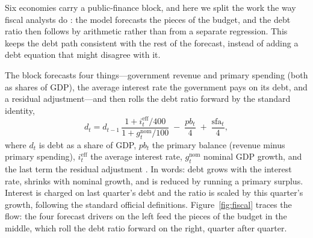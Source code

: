 \documentclass[11pt]{article}
\begin{document}
Six economies carry a public-finance block, and here we split the work the way fiscal analysts do
\citep{Escolano2010,IMF2013DSA}: the model forecasts the pieces of the budget, and the debt ratio then
follows by arithmetic rather than from a separate regression. This keeps the debt path consistent with the
rest of the forecast, instead of adding a debt equation that might disagree with it.

The block forecasts four things---government revenue and primary spending (both as shares of GDP), the
average interest rate the government pays on its debt, and a residual adjustment---and then rolls the debt
ratio forward by the standard identity,
\begin{equation}
  d_t = d_{t-1}\,\frac{1 + i^{\text{eff}}_t/400}{1 + g^{\text{nom}}_t/100}
        \;-\; \frac{pb_t}{4} \;+\; \frac{\text{sfa}_t}{4},
  \label{eq:debt}
\end{equation}
where $d_t$ is debt as a share of GDP, $pb_t$ the primary balance (revenue minus primary spending),
$i^{\text{eff}}_t$ the average interest rate, $g^{\text{nom}}_t$ nominal GDP growth, and the last term the
residual adjustment \citep{Bohn1998}. In words: debt grows with the interest rate, shrinks with nominal
growth, and is reduced by running a primary surplus. Interest is charged on last quarter's debt and the
ratio is scaled by this quarter's growth, following the standard official definitions. Figure~\ref{fig:fiscal}
traces the flow: the four forecast drivers on the left feed the pieces of the budget in the middle, which
roll the debt ratio forward on the right, quarter after quarter.
\end{document}
